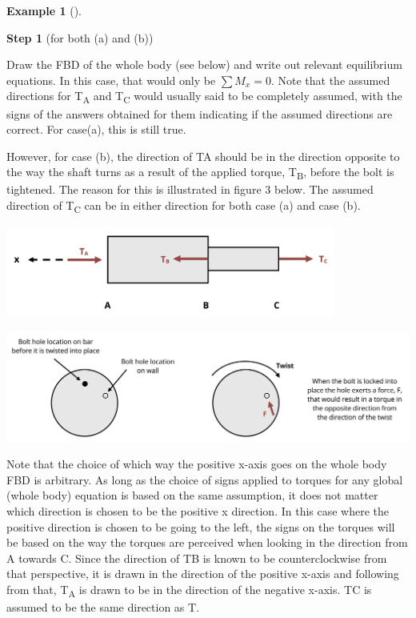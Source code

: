 \documentclass[
  letterpaper,
  DIV=11,
  numbers=noendperiod]{scrreprt}
\theoremstyle{definition}
\newtheorem{example}{Example}[chapter]
\theoremstyle{remark}
\begin{document}
\begin{tcolorbox}
\begin{example}[]
\begin{tcolorbox}
\textbf{Step 1} (for both (a) and (b))

Draw the FBD of the whole body (see below) and write out relevant
equilibrium equations. In this case, that would only be \(\sum M_x=0\).
Note that the assumed directions for T\textsubscript{A} and
T\textsubscript{C} would usually said to be completely assumed, with the
signs of the answers obtained for them indicating if the assumed
directions are correct. For case(a), this is still true.

However, for case (b), the direction of TA should be in the direction
opposite to the way the shaft turns as a result of the applied torque,
T\textsubscript{B}, before the bolt is tightened. The reason for this is
illustrated in figure 3 below. The assumed direction of
T\textsubscript{C} can be in either direction for both case (a) and case
(b).

\begin{center}
\includegraphics[width=4.26042in,height=\textheight]{images/CH6 PNGs/example 6.4 part 2.png}
\end{center}

\begin{center}
\includegraphics{images/CH6 PNGs/example 6.4 part 3.png}
\end{center}

Note that the choice of which way the positive x-axis goes on the whole
body FBD is arbitrary. As long as the choice of signs applied to torques
for any global (whole body) equation is based on the same assumption, it
does not matter which direction is chosen to be the positive x
direction. In this case where the positive direction is chosen to be
going to the left, the signs on the torques will be based on the way the
torques are perceived when looking in the direction from A towards C.
Since the direction of TB is known to be counterclockwise from that
perspective, it is drawn in the direction of the positive x-axis and
following from that, T\textsubscript{A} is drawn to be in the direction
of the negative x-axis. TC is assumed to be the same direction as T.


\end{tcolorbox}
\end{example}
\end{tcolorbox}
\end{document}
